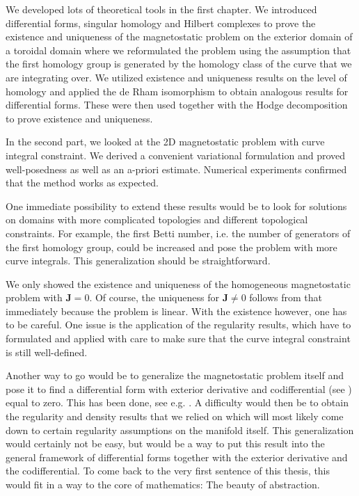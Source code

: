 \documentclass[../master_thesis.tex]{subfiles}
\begin{document}
We developed lots of theoretical tools in the first chapter. We introduced 
differential forms, singular homology and Hilbert complexes 
to prove the existence and uniqueness of the magnetostatic 
problem on the exterior domain of a toroidal domain where we reformulated the problem 
using the assumption that the first homology group is generated by the homology class 
of the curve that we are integrating over. We utilized existence and uniqueness results 
on the level of homology and applied the de Rham isomorphism to obtain analogous 
results for differential forms. These were then used together with the Hodge 
decomposition to prove existence and uniqueness.

In the second part, we looked at the 2D magnetostatic problem with curve integral 
constraint. We derived a convenient variational formulation and 
proved well-posedness as well as an a-priori estimate. Numerical experiments 
confirmed that the method works as expected.

One immediate possibility to extend these results would be to look for solutions on domains with more complicated 
topologies and different topological constraints. For example, the first Betti number, 
i.e. the number of generators of the first homology group, could be increased
and pose the problem with more curve integrals. This generalization should be 
straightforward. 

We only showed the existence and uniqueness of the homogeneous magnetostatic problem 
with $\mathbf{J}=0$. Of course, the uniqueness for $\mathbf{J} \neq 0$ follows from 
that immediately because the problem is linear. With the existence however, 
one has to be careful. One issue is the application of the regularity results,
which have to formulated and applied with care to make sure that the curve integral 
constraint is still well-defined. 

Another way to go would be to generalize the magnetostatic problem itself 
and pose it to find a differential form with exterior derivative and codifferential 
(see \cite[Sec.\,6.2.6]{arnold})
equal to zero. This has been done, see e.g. \cite[Chap.\,3]{schwarz}.
A difficulty would then be
to obtain the regularity and density results that we relied on which 
will most likely come down to certain regularity assumptions on the manifold itself.
This generalization would certainly not be easy, but would be a way to put 
this result into the general framework of differential forms together with 
the exterior derivative and the codifferential. To come back to the very
first sentence of this thesis, this would fit in a way to the core of 
mathematics: The beauty of abstraction.
\end{document}
